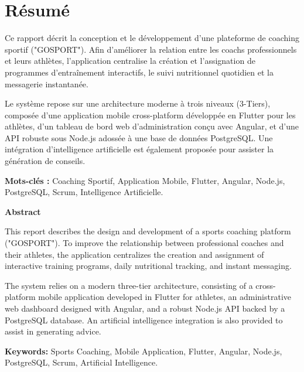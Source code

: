 \chapter*{Résumé}

Ce rapport décrit la conception et le développement d'une plateforme de coaching sportif ("GOSPORT"). Afin d'améliorer la relation entre les coachs professionnels et leurs athlètes, l'application centralise la création et l'assignation de programmes d'entraînement interactifs, le suivi nutritionnel quotidien et la messagerie instantanée. 

Le système repose sur une architecture moderne à trois niveaux (3-Tiers), composée d'une application mobile cross-platform développée en Flutter pour les athlètes, d'un tableau de bord web d'administration conçu avec Angular, et d'une API robuste sous Node.js adossée à une base de données PostgreSQL. Une intégration d'intelligence artificielle est également proposée pour assister la génération de conseils.

\textbf{Mots-clés :} Coaching Sportif, Application Mobile, Flutter, Angular, Node.js, PostgreSQL, Scrum, Intelligence Artificielle.

\vspace{2cm}

\begin{center}
    \textbf{Abstract}
\end{center}

This report describes the design and development of a sports coaching platform ("GOSPORT"). To improve the relationship between professional coaches and their athletes, the application centralizes the creation and assignment of interactive training programs, daily nutritional tracking, and instant messaging.

The system relies on a modern three-tier architecture, consisting of a cross-platform mobile application developed in Flutter for athletes, an administrative web dashboard designed with Angular, and a robust Node.js API backed by a PostgreSQL database. An artificial intelligence integration is also provided to assist in generating advice.

\textbf{Keywords:} Sports Coaching, Mobile Application, Flutter, Angular, Node.js, PostgreSQL, Scrum, Artificial Intelligence.
